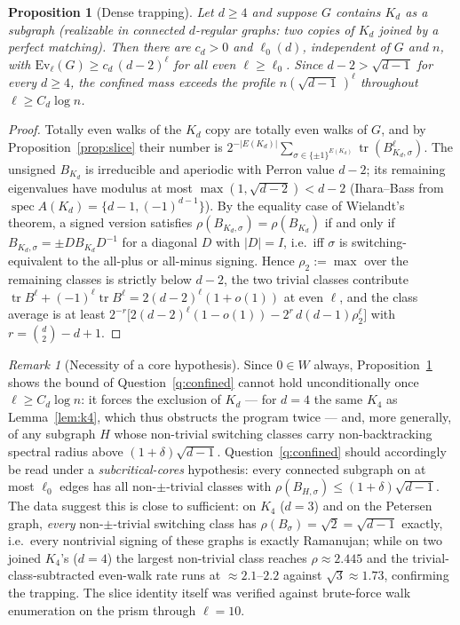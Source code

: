 \documentclass[11pt]{article}
\newtheorem{proposition}[lemma]{Proposition}
\theoremstyle{remark}
\newtheorem{remark}[lemma]{Remark}
\DeclareMathOperator{\tr}{tr}
\begin{document}
\begin{proposition}[Dense trapping]\label{prop:trap}
Let $d\ge4$ and suppose $G$ contains $K_d$ as a subgraph (realizable in
connected $d$-regular graphs: two copies of $K_d$ joined by a perfect
matching). Then there are $c_d>0$ and $\ell_0(d)$, independent of $G$
and $n$, with $\mathrm{Ev}_\ell(G)\ge c_d\,(d-2)^{\ell}$ for all even
$\ell\ge\ell_0$. Since $d-2>\sqrt{d-1}$ for every $d\ge4$, the confined
mass exceeds the profile $n(\sqrt{d-1}\,)^{\ell}$ throughout
$\ell\ge C_d\log n$.
\end{proposition}

\begin{proof}
Totally even walks of the $K_d$ copy are totally even walks of $G$, and
by Proposition~\ref{prop:slice} their number is
$2^{-|E(K_d)|}\sum_{\sigma\in\{\pm1\}^{E(K_d)}}\tr(B_{K_d,\sigma}^\ell)$.
The unsigned $B_{K_d}$ is irreducible and aperiodic with Perron value
$d-2$; its remaining eigenvalues have modulus at most
$\max(1,\sqrt{d-2})<d-2$ (Ihara--Bass from
$\operatorname{spec}A(K_d)=\{d-1,(-1)^{d-1}\}$). By the equality case of
Wielandt's theorem, a signed version satisfies
$\rho(B_{K_d,\sigma})=\rho(B_{K_d})$ if and only if
$B_{K_d,\sigma}=\pm D B_{K_d}D^{-1}$ for a diagonal $D$ with
$|D|=I$, i.e.\ iff $\sigma$ is switching-equivalent to the all-plus or
all-minus signing. Hence $\rho_2:=\max$ over the remaining classes is
strictly below $d-2$, the two trivial classes contribute
$\tr B^\ell+(-1)^\ell\tr B^\ell=2(d-2)^\ell(1+o(1))$ at even $\ell$, and
the class average is at least
$2^{-r}\big[2(d-2)^\ell(1-o(1))-2^{r}\,d(d-1)\rho_2^{\ell}\big]$ with
$r=\binom d2-d+1$.
\end{proof}

\begin{remark}[Necessity of a core hypothesis]\label{rem:core}
Since $0\in W$ always, Proposition~\ref{prop:trap} shows the bound of
Question~\ref{q:confined} cannot hold unconditionally once
$\ell\ge C_d\log n$: it forces the exclusion of $K_d$ --- for $d=4$ the
same $K_4$ as Lemma~\ref{lem:k4}, which thus obstructs the program
twice --- and, more generally, of any subgraph $H$ whose non-trivial
switching classes carry non-backtracking spectral radius above
$(1+\delta)\sqrt{d-1}$. Question~\ref{q:confined} should accordingly be
read under a \emph{subcritical-cores} hypothesis: every connected
subgraph on at most $\ell_0$ edges has all non-$\pm$-trivial classes
with $\rho(B_{H,\sigma})\le(1+\delta)\sqrt{d-1}$. The data suggest this
is close to sufficient: on $K_4$ ($d=3$) and on the Petersen graph,
\emph{every} non-$\pm$-trivial switching class has
$\rho(B_\sigma)=\sqrt2=\sqrt{d-1}$ exactly, i.e.\ every nontrivial
signing of these graphs is exactly Ramanujan; while on two joined
$K_4$'s ($d=4$) the largest non-trivial class reaches
$\rho\approx2.445$ and the trivial-class-subtracted even-walk rate runs
at $\approx2.1$--$2.2$ against $\sqrt3\approx1.73$, confirming the
trapping. The slice identity itself was verified against brute-force
walk enumeration on the prism through $\ell=10$.
\end{remark}
\end{document}
